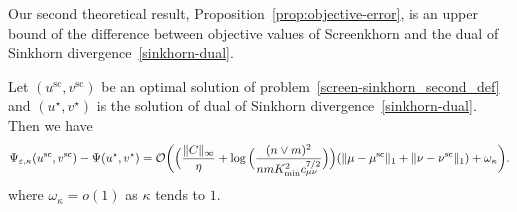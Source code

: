 Our second theoretical result, Proposition~\ref{prop:objective-error}, is an upper bound of the difference between objective values of Screenkhorn and the dual of Sinkhorn divergence~\eqref{sinkhorn-dual}.
\begin{proposition}
\label{prop:objective-error}
Let $(u^{\text{sc}}, v^{\text{sc}})$ be an optimal solution of problem~\eqref{screen-sinkhorn_second_def} and $(u^\star, v^\star)$ is the solution of dual of Sinkhorn divergence~\eqref{sinkhorn-dual}. Then we have 
\begin{align*}
\Psi_{\varepsilon, \kappa}(u^{\text{sc}} ,v^{\text{sc}}) -\Psi(u^\star, v^\star)
= \mathcal{O}\bigg(\Big(\frac{\|C\|_\infty}{\eta} + \log\Big(\frac{(n\vee m)^2}{nmK_{\min}^{2}c_{\mu\nu}^{7/2}}\Big)\Big)(\|\mu - \mu^{\text{sc}}\|_1 + \|\nu - \nu^{\text{sc}}\|_1)  + \omega_{\kappa}\bigg).
\end{align*}
where $\omega_{\kappa} = o(1)$  as $\kappa$ tends to $1.$
\end{proposition}
